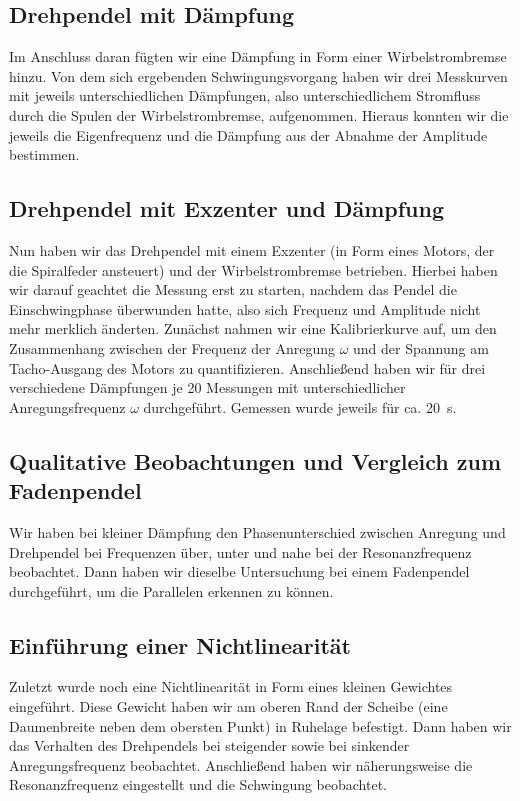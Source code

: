 \documentclass[
	a4paper,
	12pt,
	pagesize,
	ngerman
]{scrartcl}
\begin{document}
	\subsection{Drehpendel mit Dämpfung}
	Im Anschluss daran fügten wir eine Dämpfung in Form einer Wirbelstrombremse hinzu. Von dem sich ergebenden Schwingungsvorgang haben wir drei Messkurven mit jeweils unterschiedlichen Dämpfungen, also unterschiedlichem Stromfluss durch die Spulen der Wirbelstrombremse, aufgenommen. Hieraus konnten wir die jeweils die Eigenfrequenz und die Dämpfung aus der Abnahme der Amplitude bestimmen. %
	\subsection{Drehpendel mit Exzenter und Dämpfung} 
	Nun haben wir das Drehpendel mit einem Exzenter (in Form eines Motors, der die Spiralfeder ansteuert) und der Wirbelstrombremse betrieben. Hierbei haben wir darauf geachtet die Messung erst zu starten, nachdem das Pendel die Einschwingphase überwunden hatte, also sich Frequenz und Amplitude nicht mehr merklich änderten.
	Zunächst nahmen wir eine Kalibrierkurve auf, um den Zusammenhang zwischen der Frequenz der Anregung $\omega$ und der Spannung am Tacho-Ausgang des Motors zu quantifizieren.
	Anschließend haben wir für drei verschiedene Dämpfungen je 20 Messungen mit unterschiedlicher Anregungsfrequenz $\omega$ durchgeführt. Gemessen wurde jeweils für ca. \SI{20}{\second}. 
	\subsection{Qualitative Beobachtungen und Vergleich zum Fadenpendel}
	Wir haben bei kleiner Dämpfung den Phasenunterschied zwischen Anregung und Drehpendel bei Frequenzen über, unter und nahe bei der Resonanzfrequenz beobachtet. Dann haben wir dieselbe Untersuchung bei einem Fadenpendel durchgeführt, um die Parallelen erkennen zu können.
	\subsection{Einführung einer Nichtlinearität}
	Zuletzt wurde noch eine Nichtlinearität in Form eines kleinen Gewichtes eingeführt. Diese Gewicht haben wir am oberen Rand der Scheibe (eine Daumenbreite neben dem obersten Punkt) in Ruhelage befestigt. Dann haben wir das Verhalten des Drehpendels bei steigender sowie bei sinkender Anregungsfrequenz beobachtet. Anschließend haben wir näherungsweise die Resonanzfrequenz eingestellt und die Schwingung beobachtet.
	
\end{document}
